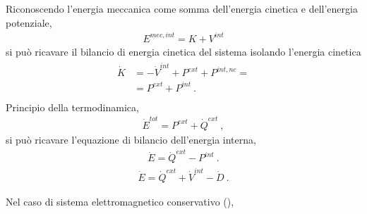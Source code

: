 \documentclass[letterpaper,10pt,english]{jupyterBook}
\begin{document}
\sphinxAtStartPar
Riconoscendo l’energia meccanica come somma dell’energia cinetica e dell’energia potenziale,
\begin{equation*}
\begin{split}E^{mec, int} = K + V^{int}\end{split}
\end{equation*}
\sphinxAtStartPar
si può ricavare il bilancio di energia cinetica del sistema isolando l’energia cinetica
\begin{equation*}
\begin{split}\begin{aligned}
  \dot{K} & = - \dot{V}^{int} + P^{ext} + P^{int,nc} = \\
          & = P^{ext} + P^{int} \ . \\
\end{aligned}\end{split}
\end{equation*}
\sphinxAtStartPar
Principio della termodinamica,
\begin{equation*}
\begin{split}\dot{E}^{tot} = P^{ext} + \dot{Q}^{ext} \ ,\end{split}
\end{equation*}
\sphinxAtStartPar
si può ricavare l’equazione di bilancio dell’energia interna,
\begin{equation*}
\begin{split}\dot{E} = \dot{Q}^{ext} - P^{int} \ .\end{split}
\end{equation*}\begin{equation*}
\begin{split}\dot{E} = \dot{Q}^{ext} + \dot{V}^{int} - \dot{D} \ .\end{split}
\end{equation*}
\sphinxAtStartPar
{}

\sphinxAtStartPar
Nel caso di sistema elettromagnetico conservativo (),

\sphinxAtStartPar
{} 
\end{document}
